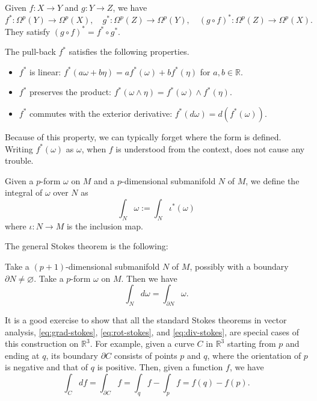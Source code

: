 \documentclass[12pt]{article}
\numberwithin{equation}{section}
\theoremstyle{remark}
\def\bR{\mathbb{R}}
\begin{document}
\begin{proposition}
  Given $f:X\to Y$ and $g:Y\to Z$,
  we have \begin{equation}
  f^*: \Omega^p(Y)\to \Omega^p(X),\quad
  g^*: \Omega^p(Z)\to \Omega^p(Y),\quad
  (g\circ f)^* : \Omega^p(Z)\to \Omega^p(X).
  \end{equation}
  They satisfy $(g\circ f)^* = f^*\circ g^*$.
\end{proposition}

\begin{proposition}
The pull-back $f^*$ satisfies the following properties.
\begin{itemize}
\item $f^*$ is linear: $f^*(a\omega + b\eta) = a f^*(\omega) + b f^*(\eta)$ for $a,b\in \bR$.
\item $f^*$ preserves the product: $f^*(\omega\wedge \eta) = f^*(\omega)\wedge f^*(\eta)$.
\item $f^*$ commutes with the exterior derivative: $f^*(d\omega) = d(f^*(\omega))$.
\end{itemize}
\end{proposition}

Because of this property, we can typically forget where the form is defined.
Writing $f^*(\omega)$ as $\omega$, when $f$ is understood from the context,
does not cause any trouble.

\begin{definition}
Given a $p$-form $\omega$ on $M$ and a $p$-dimensional submanifold $N$ of $M$,
we define the integral of $\omega$ over $N$ as \begin{equation}
\int_N \omega := \int_N \iota^*(\omega)
\end{equation}
where $\iota:N\to M$ is the inclusion map.
\end{definition}

The general Stokes theorem is the following:
\begin{proposition}
Take a $(p+1)$-dimensional submanifold $N$ of $M$, possibly with a boundary $\partial N\neq \varnothing$.
Take a $p$-form $\omega$ on $M$.
Then we have \begin{equation}
\int_N d\omega = \int_{\partial N} \omega.
\end{equation}
\end{proposition}
It is a good exercise to show that all the standard Stokes theorems in vector analysis, \eqref{eq:grad-stokes}, \eqref{eq:rot-stokes}, and \eqref{eq:div-stokes}, 
are special cases of this construction on $\bR^3$.
For example, given a curve $C$ in $\bR^3$ starting from $p$ and ending at $q$,
its boundary $\partial C$ consists of points $p$ and $q$,
where the orientation of $p$ is negative and that of $q$ is positive.
Then, given a function $f$, we have \begin{equation}
\int_C df = \int_{\partial C} f = \int_q f - \int_p f = f(q)-f(p).
\end{equation}
\end{document}
